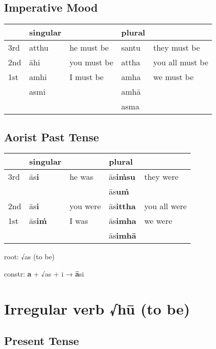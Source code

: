 \documentclass[11pt,oneside]{memoir}
\begin{document}
\subsection{Imperative Mood}
\label{sec:orgbeb0635}

\begin{center}
\begin{tabular}{lllll}
 & singular &  & plural & \\[0pt]
\hline
3rd & atthu & he must be & santu & they must be\\[0pt]
2nd & āhi & you must be & attha & you all must be\\[0pt]
1st & amhi & I must be & amha & we must be\\[0pt]
 & asmi &  & amhā & \\[0pt]
 &  &  & asma & \\[0pt]
\end{tabular}
\end{center}

\subsection{Aorist Past Tense}
\label{sec:org0b9ca7e}

\begin{center}
\begin{tabular}{lllll}
 & singular &  & plural & \\[0pt]
\hline
3rd & ās\textbf{i} & he was & ās\textbf{iṁsu} & they were\\[0pt]
 &  &  & ās\textbf{uṁ} & \\[0pt]
2nd & ās\textbf{i} & you were & ās\textbf{ittha} & you all were\\[0pt]
1st & ās\textbf{iṁ} & I was & ās\textbf{imha} & we were\\[0pt]
 &  &  & ās\textbf{imhā} & \\[0pt]
\end{tabular}
\end{center}

root: √as (to be)

constr: \textbf{a} + √as + i → \textbf{ā}si

\clearpage

\section{Irregular verb √hū (to be)}
\label{sec:org2d95fc9}
\subsection{Present Tense}
\label{sec:org4b0ea88}
\end{document}
